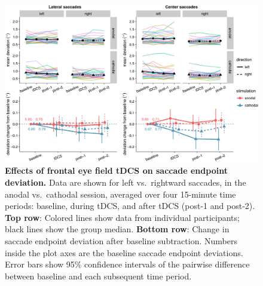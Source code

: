 \documentclass[11pt,english,]{memoir}
\begin{document}
\begin{figure}
\includegraphics[width=130mm]{sacc_tDCS_files/figures/figure_6_deviation} \caption{\textbf{Effects of frontal eye field tDCS on saccade endpoint deviation.} Data are shown for left vs.~rightward saccades, in the anodal vs.~cathodal session, averaged over four 15-minute time periods: baseline, during tDCS, and after tDCS (post-1 and post-2). \textbf{Top row}: Colored lines show data from individual participants; black lines show the group median. \textbf{Bottom row}: Change in saccade endpoint deviation after baseline subtraction. Numbers inside the plot axes are the baseline saccade endpoint deviations. Error bars show 95\% confidence intervals of the pairwise difference between baseline and each subsequent time period.}\label{fig:fig-deviation}
\end{figure}



\begingroup
\setlength{\LTleft}{-20cm plus -1fill}
\setlength{\LTright}{\LTleft}
\small
\end{document}
